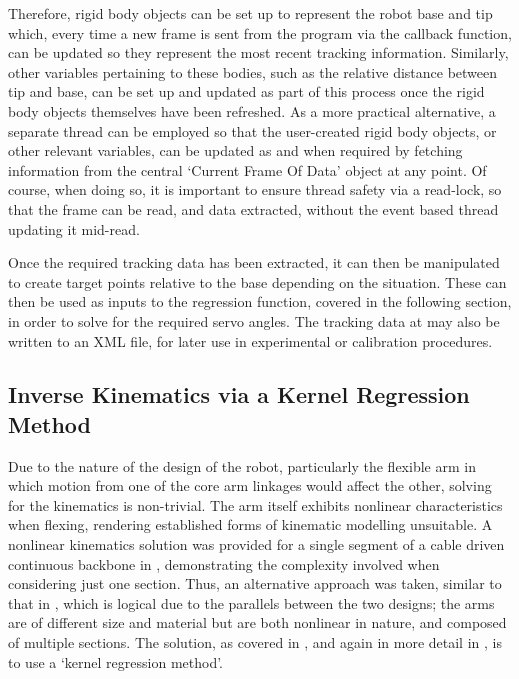 \documentclass[11pt]{article}
\begin{document}
Therefore, rigid body objects can be set up to represent the robot base and tip which, every time a new frame is sent from the program via the callback function, can be updated so they represent the most recent tracking information. Similarly, other variables pertaining to these bodies, such as the relative distance between tip and base, can be set up and updated as part of this process once the rigid body objects themselves have been refreshed. As a more practical alternative, a separate thread can be employed so that the user-created rigid body objects, or other relevant variables, can be updated as and when required by fetching information from the central `Current Frame Of Data' object at any point. Of course, when doing so, it is important to ensure thread safety via a read-lock, so that the frame can be read, and data extracted, without the event based thread updating it mid-read.

Once the required tracking data has been extracted, it can then be manipulated to create target points relative to the base depending on the situation. These can then be used as inputs to the regression function, covered in the following section, in order to solve for the required servo angles. The tracking data at may also be written to an XML file, for later use in experimental or calibration procedures.

\subsection{Inverse Kinematics via a Kernel Regression Method}
\label{section:regression}
Due to the nature of the design of the robot, particularly the flexible arm in which motion from one of the core arm linkages would affect the other, solving for the kinematics is non-trivial. The arm itself exhibits nonlinear characteristics when flexing, rendering established forms of kinematic modelling unsuitable. A nonlinear kinematics solution was provided for a single segment of a cable driven continuous backbone in \cite{li2002}, demonstrating the complexity involved when considering just one section. Thus, an alternative approach was taken, similar to that in \cite{GreggSmithDesign}, which is logical due to the parallels between the two designs; the arms are of different size and material but are both nonlinear in nature, and composed of multiple sections. The solution, as covered in \cite{GreggSmithDesign}, and again in more detail in \cite{GreggSmithPhd}, is to use a `kernel regression method'.
\end{document}
